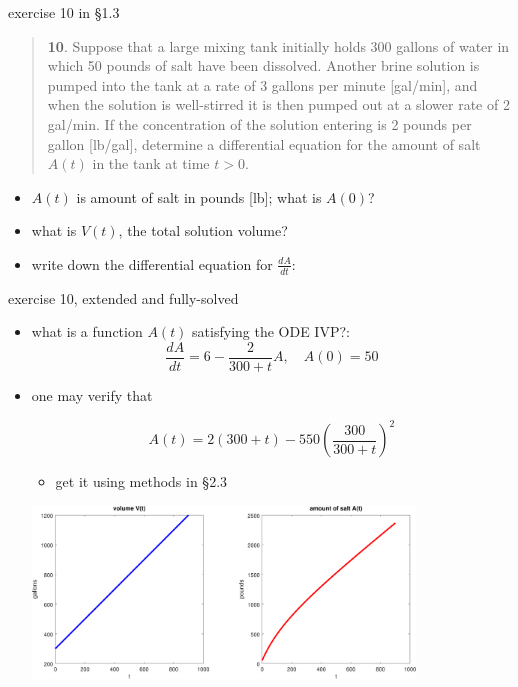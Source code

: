 \documentclass{beamer}
\begin{document}
\begin{frame}{exercise 10 in \S 1.3}

\scriptsize
\begin{quotation}
\noindent \textbf{10}.  Suppose that a large mixing tank initially holds 300 gallons of water in which 50 pounds of salt have been dissolved.  Another brine solution is pumped into the tank at a rate of 3 gallons per minute [gal/min], and when the solution is well-stirred it is then pumped out at a slower rate of 2 gal/min.  If the concentration of the solution entering is 2 pounds per gallon [lb/gal], determine a differential equation for the amount of salt $A(t)$ in the tank at time $t>0$.
\end{quotation}

\small
\begin{itemize}
\item $A(t)$ is amount of salt in pounds [lb]; what is $A(0)$?
\item what is $V(t)$, the total solution volume?
\item write down the differential equation for $\frac{dA}{dt}$:

\vspace{30mm}
\end{itemize}
\end{frame}


\begin{frame}{exercise 10, extended and fully-solved}

\begin{itemize}
\item what is a function $A(t)$ satisfying the ODE IVP?:
    $$\frac{dA}{dt} = 6 - \frac{2}{300+t} A, \quad A(0)=50$$
\item one may verify that

\vspace{-5mm}
    $$A(t) = 2 (300+t) - 550 \left(\frac{300}{300+t}\right)^2$$

\vspace{-2mm}
    \begin{itemize}
    \item get it using methods in \S 2.3
    \end{itemize}

\centerline{\includegraphics[width=0.8\textwidth]{figs/exercise-10-1-3}}
\end{itemize}
\end{frame}
\end{document}
